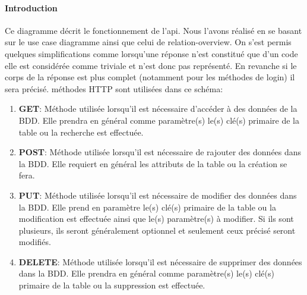 \documentclass{article}
\begin{document}
\paragraph{Introduction}

Ce diagramme décrit le fonctionnement de l'api. Nous l'avons réalisé en se basant
sur le use case diagramme ainsi que celui de relation-overview. On s'est permis quelques
simplifications comme lorsqu'une réponse n'est constitué que d'un code elle est considérée 
comme triviale et n'est donc pas représenté. En revanche si le corps de la réponse est plus
complet (notamment pour les méthodes de login) il sera précisé.
\newline
{} méthodes HTTP sont utilisées dans ce schéma:
\begin{enumerate}
    \item \textbf{GET}: Méthode utilisée lorsqu'il est nécessaire d'accéder à des données de la BDD.
                        Elle prendra en général comme paramètre(s) le(s) clé(s) primaire de la table
                        ou la recherche est effectuée.
    \item \textbf{POST}: Méthode utilisée lorsqu'il est nécessaire de rajouter des données dans la BDD.
                        Elle requiert en général les attributs de la table ou la création se fera.
    \item \textbf{PUT}: Méthode utilisée lorsqu'il est nécessaire de modifier des données dans la BDD.
                        Elle prend en paramètre le(s) clé(s) primaire de la table ou la modification est
                        effectuée ainsi que le(s) paramètre(s) à modifier. Si ils sont plusieurs, ils seront
                        généralement optionnel et seulement ceux précisé seront modifiés.
    \item \textbf{DELETE}: Méthode utilisée lorsqu'il est nécessaire de supprimer des données dans la BDD.
                            Elle prendra en général comme paramètre(s) le(s) clé(s) primaire de la table 
                            ou la suppression est effectuée.
\end{enumerate}
\end{document}
